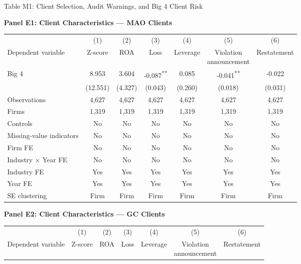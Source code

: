\documentclass[10pt]{article}
\newcommand{\sym}[1]{\textsuperscript{#1}}
\begin{document}
\begin{minipage}{19cm}\fontsize{10}{12}\selectfont\setlength{\tabcolsep}{4pt}\renewcommand{\arraystretch}{1.15}

\begin{center} Table M1: Client Selection, Audit Warnings, and Big 4 Client Risk\end{center}
\noindent\textbf{Panel E1: Client Characteristics --- MAO Clients}\par\medskip
\begin{center}\begin{tabular*}{\textwidth}{@{\extracolsep{\fill}}lcccccc@{}}
\toprule
 & (1) & (2) & (3) & (4) & (5) & (6) \\
Dependent variable & Z-score & ROA & Loss & Leverage & \shortstack{Violation\\announcement} & Restatement \\
\midrule
Big 4 & 8.953 & 3.604 & -0.087\sym{**} & 0.085 & -0.041\sym{**} & -0.022 \\
 & (12.551) & (4.327) & (0.043) & (0.260) & (0.018) & (0.031) \\
\midrule
Observations & 4,627 & 4,627 & 4,627 & 4,627 & 4,627 & 4,627 \\
Firms & 1,319 & 1,319 & 1,319 & 1,319 & 1,319 & 1,319 \\
Controls & No & No & No & No & No & No \\
Missing-value indicators & No & No & No & No & No & No \\
Firm FE & No & No & No & No & No & No \\
Industry $\times$ Year FE & No & No & No & No & No & No \\
Industry FE & Yes & Yes & Yes & Yes & Yes & Yes \\
Year FE & Yes & Yes & Yes & Yes & Yes & Yes \\
SE clustering & Firm & Firm & Firm & Firm & Firm & Firm \\
\bottomrule\end{tabular*}\end{center}
\bigskip
\noindent\textbf{Panel E2: Client Characteristics --- GC Clients}\par\medskip
\begin{center}\begin{tabular*}{\textwidth}{@{\extracolsep{\fill}}lcccccc@{}}
\toprule
 & (1) & (2) & (3) & (4) & (5) & (6) \\
Dependent variable & Z-score & ROA & Loss & Leverage & \shortstack{Violation\\announcement} & Restatement \\

\end{tabular*}
\end{center}
\end{minipage}
\end{document}
